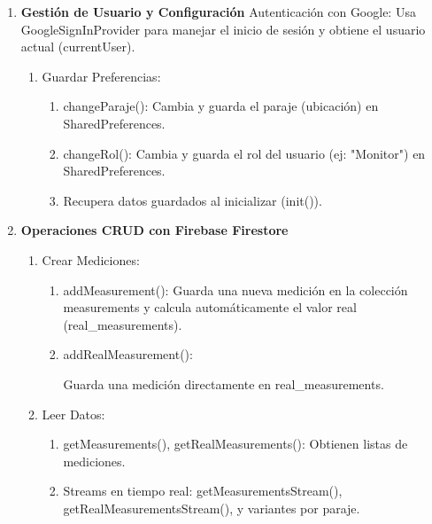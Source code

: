 \begin{enumerate}
    \item \textbf{Gestión de Usuario y Configuración}
    Autenticación con Google: Usa GoogleSignInProvider para manejar el inicio de sesión y obtiene el usuario actual (currentUser).
    
    \begin{enumerate}
      \item Guardar Preferencias:
    
    \begin{enumerate}
      \item changeParaje(): Cambia y guarda el paraje (ubicación) en SharedPreferences.
    
    \item changeRol(): Cambia y guarda el rol del usuario (ej: "Monitor") en SharedPreferences.
    
   \item Recupera datos guardados al inicializar (init()).
    \end{enumerate}
    \end{enumerate}
    
    \item \textbf{Operaciones CRUD con Firebase Firestore}
    \begin{enumerate}
      \item Crear Mediciones:
    
    \begin{enumerate}
      \item addMeasurement(): Guarda una nueva medición en la colección measurements y calcula automáticamente el valor real (real\_measurements).
    
    \item addRealMeasurement(): 
    
    Guarda una medición directamente en real\_measurements.
    \end{enumerate}
    
    \item Leer Datos:
    
    \begin{enumerate}
    \item getMeasurements(), getRealMeasurements(): Obtienen listas de mediciones.
    
    \item Streams en tiempo real: getMeasurementsStream(), getRealMeasurementsStream(), y variantes por paraje.
    \end{enumerate}
    

\end{enumerate}
\end{enumerate}

